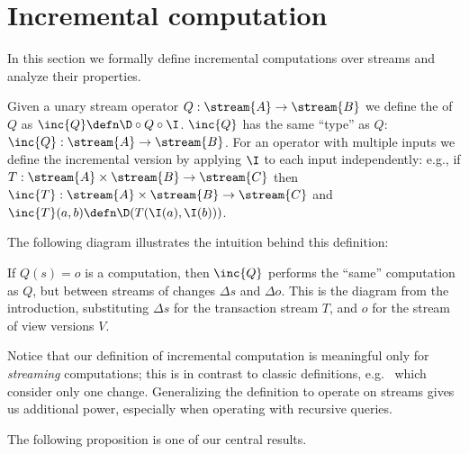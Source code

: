 \section{Incremental computation}\label{sec:incremental}

In this section we formally define incremental computations over
streams and analyze their properties.

\begin{definition}\label{def:inc}
Given a unary stream operator $Q: \stream{A} \to \stream{B}$ we define the
 of $Q$ as $\inc{Q} \defn \D \circ Q \circ \I$.
$\inc{Q}$ has the same ``type'' as $Q$: $\inc{Q}: \stream{A} \to \stream{B}$.
For an operator with multiple inputs we define
the incremental version by applying $\I$ to each input independently:
e.g., if $T: \stream{A} \times \stream{B} \rightarrow \stream{C}$ then
$\inc{T}: \stream{A} \times \stream{B} \rightarrow \stream{C}$
and $\inc{T}(a, b) \defn \D (T(\I(a), \I(b)))$.
\end{definition}

The following diagram illustrates the intuition behind this definition:

\begin{center}
\end{center}

If $Q(s) = o$ is a computation, then $\inc{Q}$ performs
the ``same'' computation as $Q$,
but between streams of changes $\Delta s$ and $\Delta o$.
This is the diagram from the
introduction, substituting $\Delta s$ for the transaction stream $T$,
and $o$ for the stream of view versions $V$.

Notice that our definition of incremental computation is meaningful only for \emph{streaming}
computations; this is in contrast to classic definitions, e.g.~\cite{gupta-idb95} which
consider only one change.  Generalizing the definition to operate on streams gives us
additional power, especially when operating with recursive queries.

The following proposition is one of our central results.

